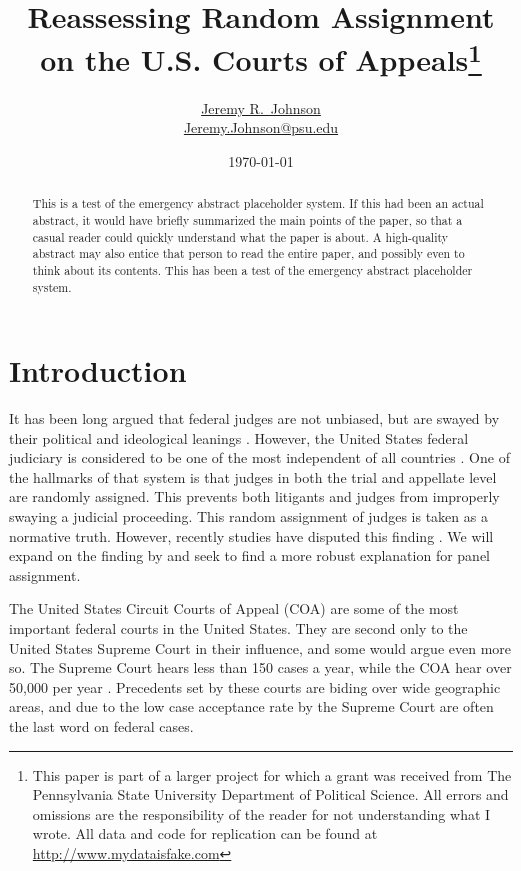 \documentclass[12pt]{article}
\title{Reassessing Random Assignment on the U.S. Courts of Appeals\footnote{This paper is part of a larger project for which a grant was received from The Pennsylvania State University Department of Political Science.  All errors and omissions are the responsibility of the reader for not understanding what I wrote.  All data and code for replication can be found at \url{http://www.mydataisfake.com} } }
\author{\href{http://www.jeremyrjohnson.org/}{Jeremy R.\ Johnson}\\ \href{mailto:Jeremy.Johnson@psu.edu}{Jeremy.Johnson@psu.edu}}
\affil{Pennsylvania State University}
\date{\today}
\begin{document}
\clearpage\maketitle\thispagestyle{empty}


\begin{abstract}
	\medskip
	This is a test of the emergency abstract placeholder system.  If this had been an actual abstract, it would have briefly summarized the main points of the paper, so that a casual reader could quickly understand what the paper is about.  A high-quality abstract may also entice that person to read the entire paper, and possibly even to think about its contents.  This has been a test of the emergency abstract placeholder system. \\
\end{abstract}

\clearpage
\setcounter{page}{1}
\setcounter{footnote}{0}
\renewcommand*{\thefootnote}{\arabic{footnote}}
\addtolength{\footnotesep}{6pt}

\section{Introduction}
It has been long argued that federal judges are not unbiased, but are swayed by their political and ideological leanings \citep{segal2002supreme}.  However, the United States federal judiciary is considered to be one of the most independent of all countries \citep{Linzer2014}.  One of the hallmarks of that system is that judges in both the trial and appellate level are randomly assigned.  This prevents both litigants and judges from improperly swaying a judicial proceeding.  This random assignment of judges is taken as a normative truth.  However, recently studies have disputed this finding \citep{Chilton2014}.  We will expand on the finding by \citeauthor{Chilton2014} and seek to find a more robust explanation for panel assignment.

The United States Circuit Courts of Appeal (COA) are some of the most important federal courts in the United States.  They are second only to the United States Supreme Court in their influence, and some would argue even more so.  The Supreme Court hears less than 150 cases a year, while the COA hear over 50,000 per year \citep{Caseloadstats}.  Precedents set by these courts are biding over wide geographic areas, and due to the low case acceptance rate by the Supreme Court are often the last word on federal cases.
\end{document}
